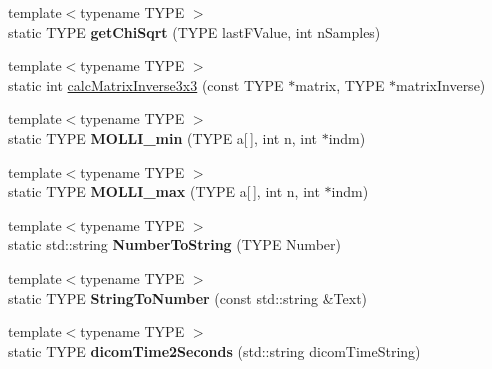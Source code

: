 \begin{DoxyCompactItemize}
\item 
\hypertarget{class_k_w_util_a2e55b0bcf1bbf1155654b748a7064cbf}{{\footnotesize template$<$typename T\-Y\-P\-E $>$ }\\static T\-Y\-P\-E {\bfseries get\-Chi\-Sqrt} (T\-Y\-P\-E last\-F\-Value, int n\-Samples)}\label{class_k_w_util_a2e55b0bcf1bbf1155654b748a7064cbf}

\item 
{\footnotesize template$<$typename T\-Y\-P\-E $>$ }\\static int \hyperlink{class_k_w_util_a80504801c382f1ac367bcf0787fb18c2}{calc\-Matrix\-Inverse3x3} (const T\-Y\-P\-E $\ast$matrix, T\-Y\-P\-E $\ast$matrix\-Inverse)
\item 
\hypertarget{class_k_w_util_a6401111c5ce49eb97e1c79bae84b3868}{{\footnotesize template$<$typename T\-Y\-P\-E $>$ }\\static T\-Y\-P\-E {\bfseries M\-O\-L\-L\-I\-\_\-min} (T\-Y\-P\-E a\mbox{[}$\,$\mbox{]}, int n, int $\ast$indm)}\label{class_k_w_util_a6401111c5ce49eb97e1c79bae84b3868}

\item 
\hypertarget{class_k_w_util_af0fee5e9d89e7c029c346804480d5832}{{\footnotesize template$<$typename T\-Y\-P\-E $>$ }\\static T\-Y\-P\-E {\bfseries M\-O\-L\-L\-I\-\_\-max} (T\-Y\-P\-E a\mbox{[}$\,$\mbox{]}, int n, int $\ast$indm)}\label{class_k_w_util_af0fee5e9d89e7c029c346804480d5832}

\item 
\hypertarget{class_k_w_util_a10aaa83c83c801ef07c95a29e1acdc4e}{{\footnotesize template$<$typename T\-Y\-P\-E $>$ }\\static std\-::string {\bfseries Number\-To\-String} (T\-Y\-P\-E Number)}\label{class_k_w_util_a10aaa83c83c801ef07c95a29e1acdc4e}

\item 
\hypertarget{class_k_w_util_adea4c36750f518d1f2c90af14742a0f6}{{\footnotesize template$<$typename T\-Y\-P\-E $>$ }\\static T\-Y\-P\-E {\bfseries String\-To\-Number} (const std\-::string \&Text)}\label{class_k_w_util_adea4c36750f518d1f2c90af14742a0f6}

\item 
\hypertarget{class_k_w_util_a21813a6377e55fa15c70f64afb2feb51}{{\footnotesize template$<$typename T\-Y\-P\-E $>$ }\\static T\-Y\-P\-E {\bfseries dicom\-Time2\-Seconds} (std\-::string dicom\-Time\-String)}\label{class_k_w_util_a21813a6377e55fa15c70f64afb2feb51}


\end{DoxyCompactItemize}
